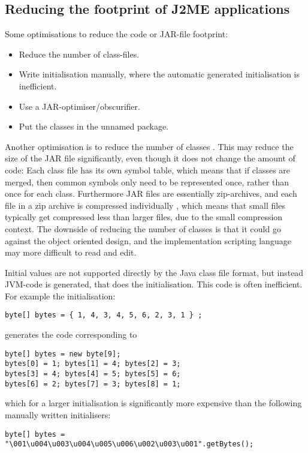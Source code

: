 \documentclass[11pt]{report}
\begin{document}
\subsection{Reducing the footprint of J2ME applications}
Some optimisations to reduce the code or JAR-file footprint:
\begin{itemize}
\item Reduce the number of class-files.
\item Write initialisation manually, where the automatic generated initialisation is inefficient.
\item Use a JAR-optimiser/obscurifier.
\item Put the classes in the unnamed package.
\end{itemize}

Another optimisation is to reduce the number of classes \cite{nokia-optim, kahlua-thesis}.
This may reduce the size of the JAR file significantly,
even though it does not change the amount of code:
Each class file has its own symbol table, which means that if classes are merged, then common symbols only need to be represented once, rather than once for each class.
Furthermore JAR files are essentially zip-archives, and each file in a zip archive is compressed individually \cite{zipspec}, which means that small files typically get compressed less than larger files, due to the small compression context.
The downside of reducing the number of classes is that it could go against the object oriented design, and the implementation scripting language may more difficult to read and edit. 

Initial values are not supported directly by the Java class file format, but instead
JVM-code is generated, that does the initialisation. 
This code is often inefficient. For example the initialisation:
\begin{verbatim}
byte[] bytes = { 1, 4, 3, 4, 5, 6, 2, 3, 1 } ;
\end{verbatim}
generates the code corresponding to
\begin{verbatim}
byte[] bytes = new byte[9];
bytes[0] = 1; bytes[1] = 4; bytes[2] = 3;
bytes[3] = 4; bytes[4] = 5; bytes[5] = 6;
bytes[6] = 2; bytes[7] = 3; bytes[8] = 1;
\end{verbatim}
which for a larger initialisation is significantly more expensive than the following manually written initialisers:
\begin{verbatim}
byte[] bytes = "\001\u004\u003\u004\u005\u006\u002\u003\u001".getBytes();
\end{verbatim}
\end{document}

